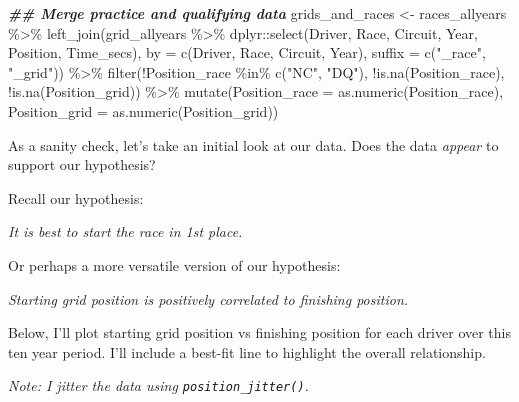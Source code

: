 \documentclass[
]{book}
\newenvironment{Shaded}{\begin{snugshade}}{\end{snugshade}}
\newcommand{\AttributeTok}[1]{\textcolor[rgb]{0.77,0.63,0.00}{#1}}
\newcommand{\DocumentationTok}[1]{\textcolor[rgb]{0.56,0.35,0.01}{\textbf{\textit{#1}}}}
\newcommand{\FunctionTok}[1]{\textcolor[rgb]{0.00,0.00,0.00}{#1}}
\newcommand{\NormalTok}[1]{#1}
\newcommand{\OtherTok}[1]{\textcolor[rgb]{0.56,0.35,0.01}{#1}}
\newcommand{\SpecialCharTok}[1]{\textcolor[rgb]{0.00,0.00,0.00}{#1}}
\newcommand{\StringTok}[1]{\textcolor[rgb]{0.31,0.60,0.02}{#1}}
\begin{document}
\begin{Shaded}
\begin{Highlighting}[]
\DocumentationTok{\#\# Merge practice and qualifying data}
\NormalTok{grids\_and\_races }\OtherTok{\textless{}{-}}\NormalTok{ races\_allyears }\SpecialCharTok{\%\textgreater{}\%}
  \FunctionTok{left\_join}\NormalTok{(grid\_allyears }\SpecialCharTok{\%\textgreater{}\%}\NormalTok{ dplyr}\SpecialCharTok{::}\FunctionTok{select}\NormalTok{(Driver, Race, Circuit, Year, Position, Time\_secs),}
            \AttributeTok{by =} \FunctionTok{c}\NormalTok{(}\StringTok{\textquotesingle{}Driver\textquotesingle{}}\NormalTok{, }\StringTok{\textquotesingle{}Race\textquotesingle{}}\NormalTok{, }\StringTok{\textquotesingle{}Circuit\textquotesingle{}}\NormalTok{, }\StringTok{\textquotesingle{}Year\textquotesingle{}}\NormalTok{),}
            \AttributeTok{suffix =} \FunctionTok{c}\NormalTok{(}\StringTok{"\_race"}\NormalTok{, }\StringTok{"\_grid"}\NormalTok{)) }\SpecialCharTok{\%\textgreater{}\%}
  \FunctionTok{filter}\NormalTok{(}\SpecialCharTok{!}\NormalTok{Position\_race }\SpecialCharTok{\%in\%} \FunctionTok{c}\NormalTok{(}\StringTok{"NC"}\NormalTok{, }\StringTok{"DQ"}\NormalTok{),}
         \SpecialCharTok{!}\FunctionTok{is.na}\NormalTok{(Position\_race),}
         \SpecialCharTok{!}\FunctionTok{is.na}\NormalTok{(Position\_grid)) }\SpecialCharTok{\%\textgreater{}\%} 
  \FunctionTok{mutate}\NormalTok{(}\AttributeTok{Position\_race =} \FunctionTok{as.numeric}\NormalTok{(Position\_race), }
         \AttributeTok{Position\_grid =} \FunctionTok{as.numeric}\NormalTok{(Position\_grid)) }
\end{Highlighting}
\end{Shaded}

As a sanity check, let's take an initial look at our data. Does the data \emph{appear} to support our hypothesis?

Recall our hypothesis:

\emph{It is best to start the race in 1st place.}

Or perhaps a more versatile version of our hypothesis:

\emph{Starting grid position is positively correlated to finishing position.}

Below, I'll plot starting grid position vs finishing position for each driver over this ten year period. I'll include a best-fit line to highlight the overall relationship.

\emph{Note: I jitter the data using \texttt{position\_jitter()}.}
\end{document}
